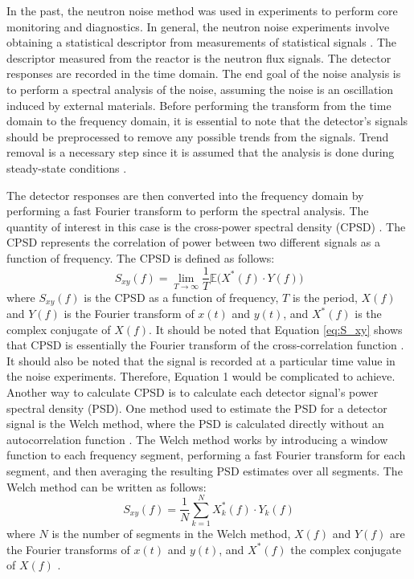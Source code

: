 In the past, the neutron noise method was used in experiments to perform core monitoring and diagnostics. In general, the neutron noise experiments involve obtaining a statistical descriptor from measurements of statistical signals \cite{thiePowerReactorNoise1981}. The descriptor measured from the reactor is the neutron flux signals. The detector responses are recorded in the time domain. The end goal of the noise analysis is to perform a spectral analysis of the noise, assuming the noise is an oscillation induced by external materials. Before performing the transform from the time domain to the frequency domain, it is essential to note that the detector’s signals should be preprocessed to remove any possible trends from the signals. Trend removal is a necessary step since it is assumed that the analysis is done during steady-state conditions \cite{mylonakisCORESIMSIMULATIONS2021}.

The detector responses are then converted into the frequency domain by performing a fast Fourier transform to perform the spectral analysis. The quantity of interest in this case is the cross-power spectral density (CPSD) \cite{ambrozicNoiseAnalysisTechniques2020}. The CPSD represents the correlation of power between two different signals as a function of frequency. The CPSD is defined as follows:
\begin{equation}
    S_{xy}(f) = \lim_{T \rightarrow \infty} \frac{1}{T} \mathbb{E} \bigg( X^*(f) \cdot Y(f) \bigg)
    \label{eq:S_xy}
\end{equation}
where $S_{xy} (f)$ is the CPSD as a function of frequency, $T$ is the period, $X(f)$ and $Y(f)$ is the Fourier transform of $x(t)$ and $y(t)$, and $X^* (f)$ is the complex conjugate of $X(f)$. It should be noted that Equation \ref{eq:S_xy} shows that CPSD is essentially the Fourier transform of the cross-correlation function \cite{thiePowerReactorNoise1981}. It should also be noted that the signal is recorded at a particular time value in the noise experiments. Therefore, Equation 1 would be complicated to achieve. Another way to calculate CPSD is to calculate each detector signal’s power spectral density (PSD). One method used to estimate the PSD for a detector signal is the Welch method, where the PSD is calculated directly without an autocorrelation function \cite{welchDirectDigitalMethod1961}. The Welch method works by introducing a window function to each frequency segment, performing a fast Fourier transform for each segment, and then averaging the resulting PSD estimates over all segments. The Welch method can be written as follows:
\begin{equation}
    S_{xy}(f) = \frac{1}{N} \sum_{k=1}^{N} X_k^*(f) \cdot Y_k(f)
\end{equation}
where $N$ is the number of segments in the Welch method, $X(f)$ and $Y(f)$ are the Fourier transforms of $x(t)$ and $y(t)$, and $X^* (f)$ the complex conjugate of $X(f)$ \cite{ambrozicNoiseAnalysisTechniques2020}.

